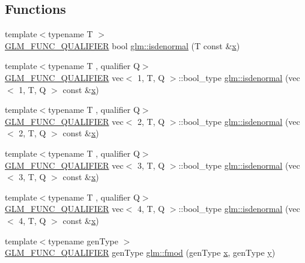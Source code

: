 \subsection*{Functions}
\begin{DoxyCompactItemize}
\item 
{\footnotesize template$<$typename T $>$ }\\\hyperlink{setup_8hpp_a33fdea6f91c5f834105f7415e2a64407}{G\+L\+M\+\_\+\+F\+U\+N\+C\+\_\+\+Q\+U\+A\+L\+I\+F\+I\+ER} bool \hyperlink{namespaceglm_ae1eb587972c0a1c492f6c7026e34ca4f}{glm\+::isdenormal} (T const \&\hyperlink{_s_d_l__opengl_8h_ad0e63d0edcdbd3d79554076bf309fd47}{x})
\item 
{\footnotesize template$<$typename T , qualifier Q$>$ }\\\hyperlink{setup_8hpp_a33fdea6f91c5f834105f7415e2a64407}{G\+L\+M\+\_\+\+F\+U\+N\+C\+\_\+\+Q\+U\+A\+L\+I\+F\+I\+ER} vec$<$ 1, T, Q $>$\+::bool\+\_\+type \hyperlink{namespaceglm_a14e320da0485ce7d23a45748fae57144}{glm\+::isdenormal} (vec$<$ 1, T, Q $>$ const \&\hyperlink{_s_d_l__opengl_8h_ad0e63d0edcdbd3d79554076bf309fd47}{x})
\item 
{\footnotesize template$<$typename T , qualifier Q$>$ }\\\hyperlink{setup_8hpp_a33fdea6f91c5f834105f7415e2a64407}{G\+L\+M\+\_\+\+F\+U\+N\+C\+\_\+\+Q\+U\+A\+L\+I\+F\+I\+ER} vec$<$ 2, T, Q $>$\+::bool\+\_\+type \hyperlink{namespaceglm_af15f64cdc779db01e37f0697c5ba3816}{glm\+::isdenormal} (vec$<$ 2, T, Q $>$ const \&\hyperlink{_s_d_l__opengl_8h_ad0e63d0edcdbd3d79554076bf309fd47}{x})
\item 
{\footnotesize template$<$typename T , qualifier Q$>$ }\\\hyperlink{setup_8hpp_a33fdea6f91c5f834105f7415e2a64407}{G\+L\+M\+\_\+\+F\+U\+N\+C\+\_\+\+Q\+U\+A\+L\+I\+F\+I\+ER} vec$<$ 3, T, Q $>$\+::bool\+\_\+type \hyperlink{namespaceglm_ae915599e1e261353da94c10571ab2113}{glm\+::isdenormal} (vec$<$ 3, T, Q $>$ const \&\hyperlink{_s_d_l__opengl_8h_ad0e63d0edcdbd3d79554076bf309fd47}{x})
\item 
{\footnotesize template$<$typename T , qualifier Q$>$ }\\\hyperlink{setup_8hpp_a33fdea6f91c5f834105f7415e2a64407}{G\+L\+M\+\_\+\+F\+U\+N\+C\+\_\+\+Q\+U\+A\+L\+I\+F\+I\+ER} vec$<$ 4, T, Q $>$\+::bool\+\_\+type \hyperlink{namespaceglm_a5e520af4ed807f0b10cef96c7809e8d7}{glm\+::isdenormal} (vec$<$ 4, T, Q $>$ const \&\hyperlink{_s_d_l__opengl_8h_ad0e63d0edcdbd3d79554076bf309fd47}{x})
\item 
{\footnotesize template$<$typename gen\+Type $>$ }\\\hyperlink{setup_8hpp_a33fdea6f91c5f834105f7415e2a64407}{G\+L\+M\+\_\+\+F\+U\+N\+C\+\_\+\+Q\+U\+A\+L\+I\+F\+I\+ER} gen\+Type \hyperlink{namespaceglm_a823bda2877e4dcc4440987f94e0e3690}{glm\+::fmod} (gen\+Type \hyperlink{_s_d_l__opengl_8h_ad0e63d0edcdbd3d79554076bf309fd47}{x}, gen\+Type \hyperlink{_s_d_l__opengl_8h_a1675d9d7bb68e1657ff028643b4037e3}{y})

\end{DoxyCompactItemize}

